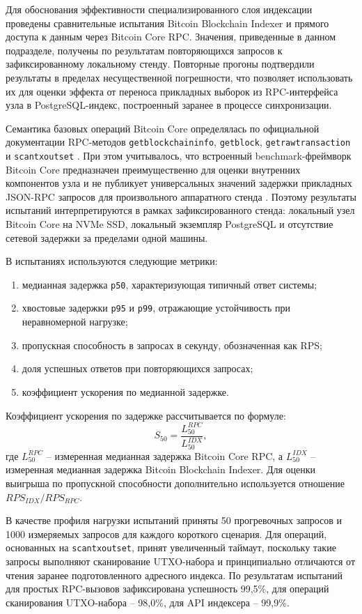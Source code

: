 Для обоснования эффективности специализированного слоя индексации проведены
сравнительные испытания Bitcoin Blockchain Indexer и прямого доступа к данным
через Bitcoin Core RPC. Значения, приведенные в данном подразделе, получены
по результатам повторяющихся запросов к зафиксированному локальному стенду.
Повторные прогоны подтвердили результаты в пределах несущественной погрешности,
что позволяет использовать их для оценки эффекта от переноса прикладных
выборок из RPC-интерфейса узла в PostgreSQL-индекс, построенный заранее в
процессе синхронизации.

Семантика базовых операций Bitcoin Core определялась по официальной
документации RPC-методов \texttt{getblockchaininfo}, \texttt{getblock},
\texttt{getrawtransaction} и \texttt{scantxoutset}
\cite{btc_core_rpc, bitcoin_core_rpc_29}. При этом учитывалось, что
встроенный benchmark-фреймворк Bitcoin Core предназначен преимущественно для
оценки внутренних компонентов узла и не публикует универсальных значений
задержки прикладных JSON-RPC запросов для произвольного аппаратного стенда
\cite{bitcoin_core_benchmarking}. Поэтому результаты испытаний
интерпретируются в рамках зафиксированного стенда: локальный узел Bitcoin Core
на NVMe SSD, локальный экземпляр PostgreSQL и отсутствие сетевой задержки за
пределами одной машины.

В испытаниях используются следующие метрики:
\begin{enumerate}
    \item медианная задержка \texttt{p50}, характеризующая типичный ответ системы;
    \item хвостовые задержки \texttt{p95} и \texttt{p99}, отражающие устойчивость при
    неравномерной нагрузке;
    \item пропускная способность в запросах в секунду, обозначенная как RPS;
    \item доля успешных ответов при повторяющихся запросах;
    \item коэффициент ускорения по медианной задержке.
\end{enumerate}

Коэффициент ускорения по задержке рассчитывается по формуле:
\[
S_{50} = \frac{L_{50}^{RPC}}{L_{50}^{IDX}},
\]
где $L_{50}^{RPC}$ -- измеренная медианная задержка Bitcoin Core RPC, а
$L_{50}^{IDX}$ -- измеренная медианная задержка Bitcoin Blockchain Indexer.
Для оценки выигрыша по пропускной способности дополнительно используется
отношение $RPS_{IDX}/RPS_{RPC}$.

В качестве профиля нагрузки испытаний приняты 50 прогревочных запросов и
1000 измеряемых запросов для каждого короткого сценария. Для операций,
основанных на \texttt{scantxoutset}, принят увеличенный таймаут, поскольку
такие запросы выполняют сканирование UTXO-набора и принципиально отличаются от
чтения заранее подготовленного адресного индекса. По результатам испытаний для
простых RPC-вызовов зафиксирована успешность 99,5\%, для операций
сканирования UTXO-набора -- 98,0\%, для API индексера -- 99,9\%.

